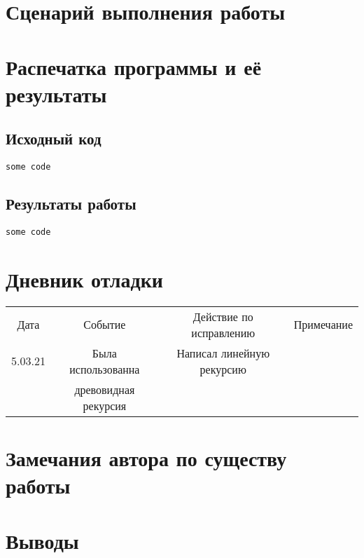 \documentclass[15pt]{extarticle}
\begin{document}
\section{Сценарий выполнения работы}

\section{Распечатка программы и её результаты}

\subsection{Исходный код}

\begin{lstlisting}
some code
\end{lstlisting}

\subsection{Результаты работы}

\begin{lstlisting}
some code
\end{lstlisting}

\section{Дневник отладки}

\begin{tabular}{|c|c|c|c|}
\hline
Дата     & Событие              & Действие по исправлению   & Примечание \\
5.03.21 & Была использованна   & Написал линейную рекурсию &            \\
         & древовидная рекурсия &                           &            \\
\hline
\end{tabular}

\section{Замечания автора по существу работы}

\section{Выводы}
\end{document}
